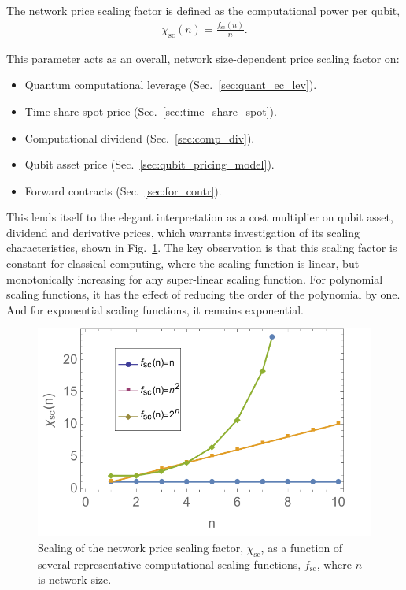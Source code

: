 \begin{definition}\label{def:NPSF}
The network price scaling factor is defined as the computational power per qubit,
\begin{align}
\chi_\text{sc}(n) = \frac{f_\text{sc}(n)}{n}.
\end{align}
\end{definition}

This parameter acts as an overall, network size-dependent price scaling factor on:
\begin{itemize}
\item Quantum computational leverage (Sec.~\ref{sec:quant_ec_lev}).
\item Time-share spot price (Sec.~\ref{sec:time_share_spot}).
\item Computational dividend (Sec.~\ref{sec:comp_div}).
\item Qubit asset price (Sec.~\ref{sec:qubit_pricing_model}).
\item Forward contracts (Sec.~\ref{sec:for_contr}).
\end{itemize}

This lends itself to the elegant interpretation as a cost multiplier on qubit asset, dividend and derivative prices, which warrants investigation of its scaling characteristics, shown in Fig.~\ref{fig:NPSF}. The key observation is that this scaling factor is constant for classical computing, where the scaling function is linear, but monotonically increasing for any super-linear scaling function. For polynomial scaling functions, it has the effect of reducing the order of the polynomial by one. And for exponential scaling functions, it remains exponential.

\begin{figure}[htb!]
	\includegraphics[width=\columnwidth]{network_price_scaling_factor}
	\caption{Scaling of the network price scaling factor, $\chi_\text{sc}$, as a function of several representative computational scaling functions, $f_\text{sc}$, where $n$ is network size.} \label{fig:NPSF}
\end{figure}

